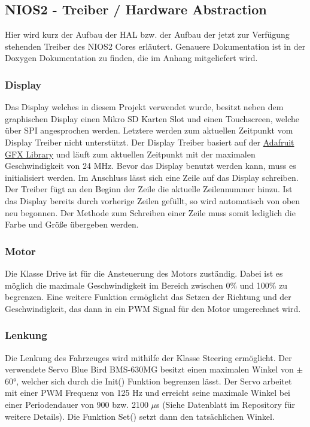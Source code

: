 \subsection{NIOS2 - Treiber / Hardware Abstraction}
Hier wird kurz der Aufbau der HAL bzw. der Aufbau der jetzt zur Verfügung stehenden Treiber des NIOS2 Cores erläutert. Genauere Dokumentation ist in der Doxygen Dokumentation zu finden, die im Anhang mitgeliefert wird. 
\subsubsection{Display}
Das Display welches in diesem Projekt verwendet wurde, besitzt neben dem graphischen Display einen Mikro SD Karten Slot und einen Touchscreen, welche über SPI angesprochen werden. Letztere werden zum aktuellen Zeitpunkt vom Display Treiber nicht unterstützt. Der Display Treiber basiert auf der \href{https://github.com/adafruit/Adafruit-GFX-Library}{Adafruit GFX Library} und läuft zum aktuellen Zeitpunkt mit der maximalen Geschwindigkeit von 24 MHz. Bevor das Display benutzt werden kann, muss es initialisiert werden. Im Anschluss lässt sich eine Zeile auf das Display schreiben. Der Treiber fügt an den Beginn der Zeile die aktuelle Zeilennummer hinzu. Ist das Display bereits durch vorherige Zeilen gefüllt, so wird automatisch von oben neu begonnen. Der Methode zum Schreiben einer Zeile muss somit lediglich die Farbe und Größe übergeben werden.
\subsubsection{Motor}
Die Klasse Drive ist für die Ansteuerung des Motors zuständig. Dabei ist es möglich die maximale Geschwindigkeit im Bereich zwischen 0\% und 100\% zu begrenzen. Eine weitere Funktion ermöglicht das Setzen der Richtung und der Geschwindigkeit, das dann in ein PWM Signal für den Motor umgerechnet wird. 
\subsubsection{Lenkung}
Die Lenkung des Fahrzeuges wird mithilfe der Klasse Steering ermöglicht. Der verwendete Servo Blue Bird BMS-630MG besitzt einen maximalen Winkel von $\pm$60°, welcher sich durch die Init() Funktion begrenzen lässt. Der Servo arbeitet mit einer PWM Frequenz von 125 Hz und erreicht seine maximale Winkel bei einer Periodendauer von 900 bzw. 2100 $\mu$s (Siehe Datenblatt im Repository für weitere Details). Die Funktion Set() setzt dann den tatsächlichen Winkel.
